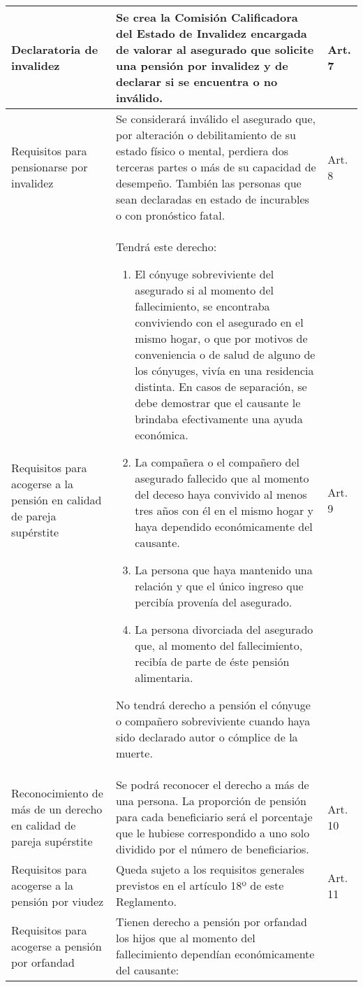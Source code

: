 \documentclass[
]{article}
\begin{document}
\begin{longtable}{|m{4cm}|m{10cm}|m{1.3cm}|}
\hline
Declaratoria de invalidez & Se crea la Comisión Calificadora del Estado de Invalidez encargada de valorar al asegurado que solicite una pensión por invalidez y de declarar si se encuentra o no inválido. & Art. 7 \\
\hline
Requisitos para pensionarse por invalidez & Se considerará inválido el asegurado que, por alteración o debilitamiento de su estado físico o mental, perdiera dos terceras partes o más de su capacidad de desempeño. También las personas que sean declaradas en estado de incurables o con pronóstico fatal. & Art. 8 \\
\hline
Requisitos para acogerse a la pensión en calidad de pareja supérstite & Tendrá este derecho:
 \begin{enumerate}
     \item El cónyuge sobreviviente del asegurado si al momento del fallecimiento, se encontraba conviviendo con el asegurado en el mismo hogar, o que por motivos de conveniencia o de salud de alguno de los cónyuges, vivía en una residencia distinta. En casos de separación, se debe demostrar que el causante le brindaba efectivamente una ayuda económica.
     \item La compañera o el compañero del asegurado fallecido que al momento del deceso haya convivido al menos tres años con él en el mismo hogar y haya dependido económicamente del causante. 
     \item La persona que haya mantenido una relación y que el único ingreso que percibía provenía del asegurado.
     \item La persona divorciada del asegurado que, al momento del fallecimiento, recibía de parte de éste pensión alimentaria.
 \end{enumerate}
No tendrá derecho a pensión el cónyuge o compañero sobreviviente cuando haya sido declarado autor o cómplice de la muerte. & Art. 9 \\
\hline
Reconocimiento de más de un derecho en calidad de pareja supérstite & Se podrá reconocer el derecho a más de una persona. La proporción de pensión para cada beneficiario será el porcentaje que le hubiese correspondido a uno solo dividido por el número de beneficiarios. & Art. 10 \\
\hline
Requisitos para acogerse a la pensión por viudez & Queda sujeto a los requisitos generales previstos en el artículo 18º de este Reglamento. & Art. 11 \\
\hline
\multirow{2}{=}{Requisitos para acogerse a pensión por orfandad} & Tienen derecho a pensión por orfandad los hijos que al momento del fallecimiento dependían económicamente del causante:

\end{longtable}
\end{document}

